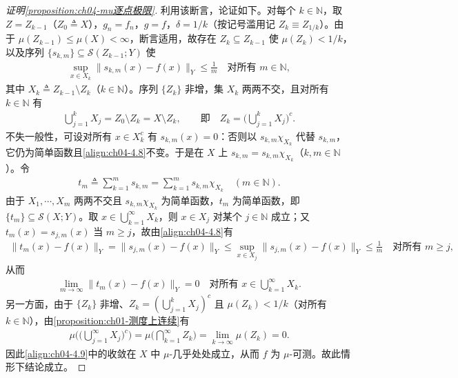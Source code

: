 \documentclass[../../main.tex]{subfiles}%
\begin{document}
\begin{proof}[证明\cref{proposition:ch04-mu逐点极限}]
利用该断言，论证如下。对每个 $k\in\mathbb{N}$，取 $Z=Z_{k-1}$（$Z_0\triangleq X$），$g_n=f_n$，$g=f$，$\delta=1/k$（按记号滥用记 $Z_k\equiv Z_{1/k}$）。由于 $\mu(Z_{k-1})\leqslant\mu(X)<\infty$，断言适用，故存在 $Z_k\subseteq Z_{k-1}$ 使 $\mu(Z_k)<1/k$，以及序列 $\{s_{k,m}\}\subseteq\mathcal{S}(Z_{k-1};Y)$ 使
\begin{align}
\sup_{x\in X_k}\|s_{k,m}(x)-f(x)\|_Y\leqslant\frac1m\quad\text{对所有 }m\in\mathbb{N}, \label{align:ch04-4.8}
\end{align}
其中 $X_k\triangleq Z_{k-1}\setminus Z_k$（$k\in\mathbb{N}$）。序列 $\{Z_k\}$ 非增，集 $X_k$ 两两不交，且对所有 $k\in\mathbb{N}$ 有
\begin{align*}
\bigcup_{j=1}^kX_j=Z_0\setminus Z_k=X\setminus Z_k,\qquad\text{即}\quad Z_k=\Big(\bigcup_{j=1}^kX_j\Big)^c.
\end{align*}
不失一般性，可设对所有 $x\in X_k^c$ 有 $s_{k,m}(x)=0$：否则以 $s_{k,m}\chi_{X_k}$ 代替 $s_{k,m}$，它仍为简单函数且\eqref{align:ch04-4.8}不变。于是在 $X$ 上 $s_{k,m}=s_{k,m}\chi_{X_k}$（$k,m\in\mathbb{N}$）。令
\begin{align*}
t_m\triangleq \sum_{k=1}^m s_{k,m}=\sum_{k=1}^m s_{k,m}\chi_{X_k}\quad(m\in\mathbb{N}).
\end{align*}
由于 $X_1,\cdots ,X_m$ 两两不交且 $s_{k,m}\chi_{X_k}$ 为简单函数，$t_m$ 为简单函数，即 $\{t_m\}\subseteq\mathcal{S}(X;Y)$。取 $x\in\bigcup_{k=1}^\infty X_k$，则 $x\in X_j$ 对某个 $j\in\mathbb{N}$ 成立；又 $t_m(x)=s_{j,m}(x)$ 当 $m\geqslant j$，故由\eqref{align:ch04-4.8}有
\begin{align*}
\|t_m(x)-f(x)\|_Y=\|s_{j,m}(x)-f(x)\|_Y\leqslant\sup_{x\in X_j}\|s_{j,m}(x)-f(x)\|_Y\leqslant\frac1m\quad\text{对所有 }m\geqslant j,
\end{align*}
从而
\begin{align}
\lim_{m\to\infty}\|t_m(x)-f(x)\|_Y=0\quad\text{对所有 }x\in\bigcup_{k=1}^\infty X_k. \label{align:ch04-4.9}
\end{align}
另一方面，由于 $\{Z_k\}$ 非增、$Z_k=(\bigcup_{j=1}^kX_j)^c$ 且 $\mu(Z_k)<1/k$（对所有 $k\in\mathbb{N}$），由\cref{proposition:ch01-测度上连续}有
\begin{align*}
\mu\Big(\Big(\bigcup_{j=1}^\infty X_j\Big)^c\Big)=\mu\Big(\bigcap_{k=1}^\infty Z_k\Big)=\lim_{k\to\infty}\mu(Z_k)=0.
\end{align*}
因此\eqref{align:ch04-4.9}中的收敛在 $X$ 中 $\mu$-几乎处处成立，从而 $f$ 为 $\mu$-可测。故此情形下结论成立。


\end{proof}
\end{document}
